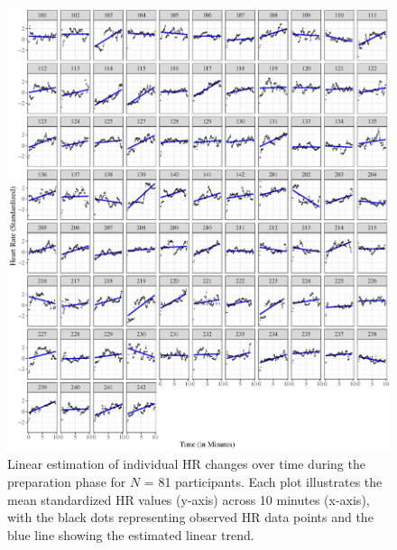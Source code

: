 \documentclass[preprint,
3p]{elsarticle} %
\begin{document}
\begin{figure}[htbp]
  \centering
  \includegraphics[width=1\textwidth]{plots_publication/plot_preparation_appendix.pdf}
  \caption{Linear estimation of individual HR changes over time during the preparation phase for $N$ = 81 participants. Each plot illustrates the mean standardized HR values (y-axis) across 10 minutes (x-axis), with the black dots representing observed HR data points and the blue line showing the estimated linear trend.}
  \label{fig.a3}
\end{figure}
\end{document}
